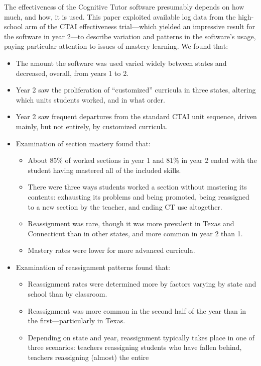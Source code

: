 \documentclass[notitlepage,12pt]{jedm}\usepackage[]{graphicx}\usepackage[]{color}
\begin{document}
The effectiveness of the Cognitive Tutor software presumably depends
on how much, and how, it is used.
This paper exploited available log data from the high-school arm of the CTAI
effectiveness trial---which yielded an impressive result for the
software in year 2---to describe variation and patterns in the software's
usage, paying particular attention to issues of mastery learning.
We found that:
\begin{itemize}
 \item The amount the software was used varied widely between states
   and decreased, overall, from years 1 to 2.
 \item Year 2 saw the proliferation of ``customized'' curricula in
   three states, altering which units students worked, and in what
   order.
 \item Year 2 saw frequent departures from the standard CTAI unit
   sequence, driven mainly, but not entirely, by customized
   curricula.
 \item Examination of section mastery found that:
 \begin{itemize}
  \item About 85\% of
    worked sections in year 1 and
    81\% in  year 2 ended
    with the student having mastered all of the included skills.
  \item There were three ways students worked a section without
    mastering its contents: exhausting its problems and being
    promoted, being reassigned to a new section by the teacher, and
    ending CT use altogether.
  \item Reassignment was rare, though it was more prevalent in Texas
    and Connecticut than in other states, and more common in year 2
    than 1.
  \item Mastery rates were lower for more advanced curricula.
 \end{itemize}
 \item Examination of reassignment patterns found that:
  \begin{itemize}
   \item Reassignment rates were determined more by factors varying by state and school
     than by classroom.
   \item Reassignment was more common in the second half of the year
     than in the first---particularly in Texas.
   \item Depending on state and year, reassignment typically takes
     place in one of three scenarios: teachers reassigning students
     who have fallen behind, teachers reassigning (almost) the entire

\end{itemize}
\end{itemize}
\end{document}
